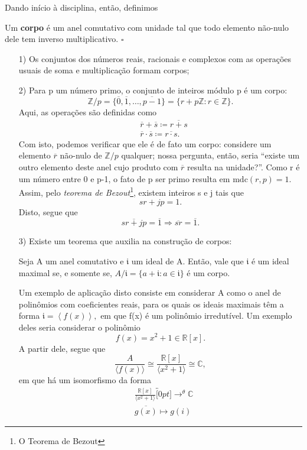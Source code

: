 \documentclass[../algebraIII_notes.tex]{subfiles}
\begin{document}
Dando início à disciplina, então, definimos
\begin{def*}
	Um \textbf{corpo} é um anel comutativo com unidade tal que todo elemento não-nulo dele tem inverso multiplicativo. \(\square\)
\end{def*}
\begin{example}
	\begin{itemize}
		\item[1)] Os conjuntos dos números reais, racionais e complexos com as operações usuais de soma e multiplicação formam corpos;
		\item[2)] Para p um número primo, o conjunto de inteiros módulo p é um corpo:
		      \[
			      \mathbb{Z}/p = \{\overline{0}, \overline{1}, \dotsc , \overline{p-1}\} = \{r + p \mathbb{Z}: r \in \mathbb{Z}\}.
		      \]
		      Aqui, as operações são definidas como
		      \begin{align*}
			       & \overline{r} + \overline{s} \coloneqq \overline{r+s}           \\
			       & \overline{r}\cdot \overline{s} \coloneqq \overline{r \cdot s}.
		      \end{align*}
		      Com isto, podemos verificar que ele é de fato um corpo: considere um elemento \(\overline{r}\) não-nulo de \(\mathbb{Z}/p\) qualquer; nossa pergunta, então, seria ``existe um outro elemento deste anel cujo produto com \(\overline{r}\) resulta na unidade?''.
		      Como r é um número entre 0 e p-1, o fato de p ser primo resulta em \(\mathrm{mdc}(r, p) = 1\). Assim, pelo \textit{teorema de Bezout}\footnote{O Teorema de Bezout}, existem inteiros s e j tais que
		      \[
			      sr + jp = 1.
		      \]
		      Disto, segue que
		      \[
			      \overline{sr + jp} = \overline{1} \Rightarrow \overline{sr} = \overline{1}.
		      \]
		\item[3)] Existe um teorema que auxilia na construção de corpos:
		      \hypertarget{field_generator}{\begin{theorem*}
				      Seja A um anel comutativo e \(\mathfrak{i}\) um ideal de A. Então, vale que \(\mathfrak{i}\) é um ideal maximal se, e somente se, \(A/\mathfrak{i} = \{a + \mathfrak{i}: a \in \mathfrak{i}\}\) é um corpo.
			      \end{theorem*}}
		      Um exemplo de aplicação disto consiste em considerar A como o anel de polinômios com coeficientes reais, para os quais os ideais maximais têm a forma \(\mathfrak{i} = \left< f(x) \right>,\) em que f(x) é um polinômio irredutível. Um exemplo deles seria considerar o polinômio
		      \[
			      f(x) = x^{2} + 1\in \mathbb{R}[x].
		      \]
		      A partir dele, segue que
		      \[
			      \frac{A}{\langle f(x) \rangle}\cong \frac{\mathbb{R}[x]}{\langle x^{2} + 1\rangle}\cong \mathbb{C},
		      \]
		      em que há um isomorfismo da forma
		      \begin{align*}
			       & \frac{\mathbb{R}[x]}{\langle x^{2}+1 \rangle}  \overbracket[0pt]{\rightarrow}^{\theta }\mathbb{C} \\
			       & \overline{g(x)}\longmapsto g(i)
		      \end{align*}


\end{itemize}
\end{example}
\end{document}
